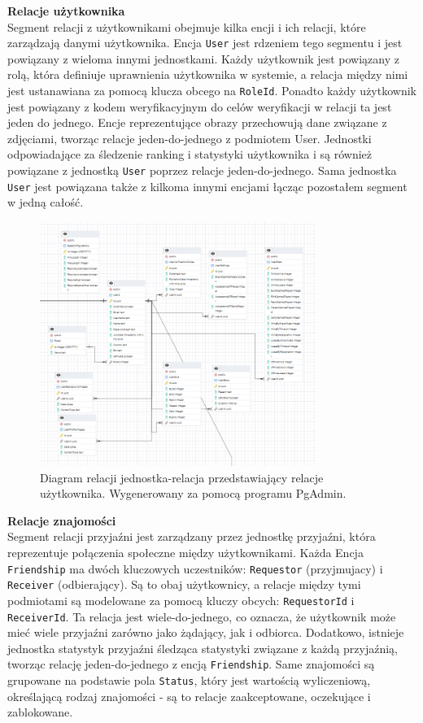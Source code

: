 \documentclass[twoside]{projektInzynierskiMS1}
\begin{document}
\noindent \textbf{Relacje użytkownika}\\
Segment relacji z użytkownikami obejmuje kilka encji i ich relacji, które zarządzają danymi użytkownika. Encja \texttt{User} jest rdzeniem tego segmentu i jest powiązany z wieloma innymi jednostkami. Każdy użytkownik jest powiązany z rolą, która definiuje uprawnienia użytkownika w systemie, a relacja między nimi jest ustanawiana za pomocą klucza obcego na \texttt{RoleId}. Ponadto każdy użytkownik jest powiązany z kodem weryfikacyjnym do celów weryfikacji w relacji ta jest jeden do jednego. Encje reprezentujące obrazy przechowują dane związane z zdjęciami, tworząc relacje jeden-do-jednego z podmiotem User. Jednostki odpowiadające za śledzenie ranking i statystyki użytkownika i są również powiązane z jednostką \texttt{User} poprzez relacje jeden-do-jednego. Sama jednostka \texttt{User} jest powiązana także z kilkoma innymi encjami łącząc pozostałem segment w jedną całość.

\vspace{0.5cm}
\begin{figure}[h!]
    \centering
    \includegraphics[width=0.8\textwidth]{images/ERD_user.png}
    \caption{Diagram relacji jednostka-relacja przedstawiający relacje użytkownika. Wygenerowany za pomocą programu PgAdmin.}
\end{figure}

\newpage

\noindent \textbf{Relacje znajomości}\\
Segment relacji przyjaźni jest zarządzany przez jednostkę przyjaźni, która reprezentuje połączenia społeczne między użytkownikami. Każda Encja \texttt{Friendship} ma dwóch kluczowych uczestników: \texttt{Requestor} (przyjmujacy) i \texttt{Receiver} (odbierający). Są to obaj użytkownicy, a relacje między tymi podmiotami są modelowane za pomocą kluczy obcych: \texttt{RequestorId} i \texttt{ReceiverId}. Ta relacja jest wiele-do-jednego, co oznacza, że użytkownik może mieć wiele przyjaźni zarówno jako żądający, jak i odbiorca. Dodatkowo, istnieje jednostka statystyk przyjaźni śledząca statystyki związane z każdą przyjaźnią, tworząc relację jeden-do-jednego z encją \texttt{Friendship}. Same znajomości są grupowane na podstawie pola \texttt{Status}, który jest wartością wyliczeniową, określającą rodzaj znajomości - są to relacje zaakceptowane, oczekujące i zablokowane.
\end{document}
